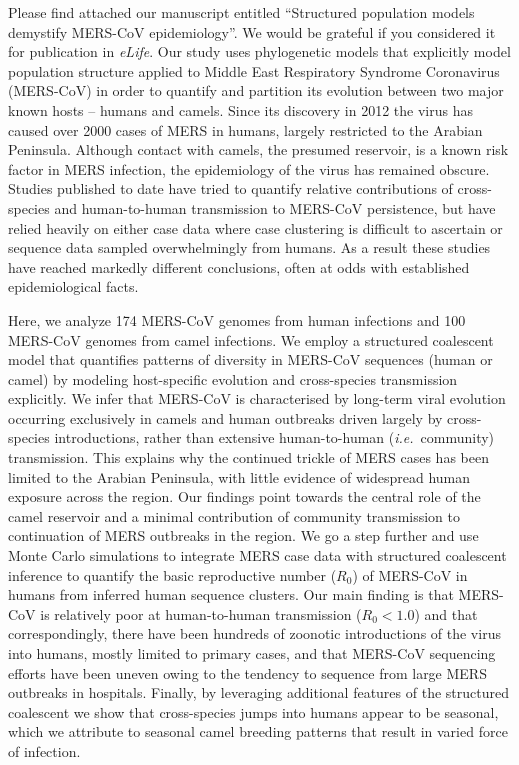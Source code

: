 \documentclass[stdletter,letterpaper,addrfromright,orderfromdateto,dateleft,11pt,noaddrto,sigleft]{newlfm}
\begin{document}
\begin{newlfm}
Please find attached our manuscript entitled ``Structured population models demystify MERS-CoV epidemiology''.
We would be grateful if you considered it for publication in \textit{eLife}.
Our study uses phylogenetic models that explicitly model population structure applied to Middle East Respiratory Syndrome Coronavirus (MERS-CoV) in order to quantify and partition its evolution between two major known hosts -- humans and camels. %
Since its discovery in 2012 the virus has caused over 2000 cases of MERS in humans, largely restricted to the Arabian Peninsula.
Although contact with camels, the presumed reservoir, is a known risk factor in MERS infection, the epidemiology of the virus has remained obscure.
Studies published to date have tried to quantify relative contributions of cross-species and human-to-human transmission to MERS-CoV persistence, but have relied heavily on either case data where case clustering is difficult to ascertain or sequence data sampled overwhelmingly from humans.
As a result these studies have reached markedly different conclusions, often at odds with established epidemiological facts.

Here, we analyze 174 MERS-CoV genomes from human infections and 100 MERS-CoV genomes from camel infections.
We employ a structured coalescent model that quantifies patterns of diversity in MERS-CoV sequences (human or camel) by modeling host-specific evolution and cross-species transmission explicitly.
We infer that MERS-CoV is characterised by long-term viral evolution occurring exclusively in camels and human outbreaks driven largely by cross-species introductions, rather than extensive human-to-human (\textit{i.e.}\ community) transmission.
This explains why the continued trickle of MERS cases has been limited to the Arabian Peninsula, with little evidence of widespread human exposure across the region.
Our findings point towards the central role of the camel reservoir and a minimal contribution of community transmission to continuation of MERS outbreaks in the region.
We go a step further and use Monte Carlo simulations to integrate MERS case data with structured coalescent inference to quantify the basic reproductive number ($R_{0}$) of MERS-CoV in humans from inferred human sequence clusters.
Our main finding is that MERS-CoV is relatively poor at human-to-human transmission ($R_{0}<1.0$) and that correspondingly, there have been hundreds of zoonotic introductions of the virus into humans, mostly limited to primary cases, and that MERS-CoV sequencing efforts have been uneven owing to the tendency to sequence from large MERS outbreaks in hospitals.
Finally, by leveraging additional features of the structured coalescent we show that cross-species jumps into humans appear to be seasonal, which we attribute to seasonal camel breeding patterns that result in varied force of infection.


\end{newlfm}
\end{document}
